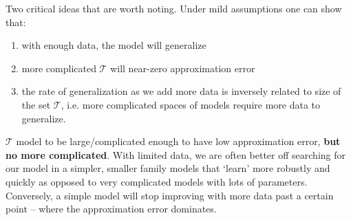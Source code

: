 Two critical ideas that are worth noting. Under mild assumptions one can show that:
\begin{enumerate}
\item with enough data, the model will generalize
\item  more complicated $\mathcal{T}$ will near-zero approximation error 
\item the rate of generalization as we add more data is inversely related to size of the set $\mathcal{T}$, i.e. more complicated spaces of models require more data to generalize. 
\end{enumerate}
$\mathcal{T}$ model to be large/complicated enough to have low approximation error,  \textbf{but no more complicated}.  With limited data, we are often better off searching for our model in a simpler, smaller family models that `learn' more robustly and quickly as opposed to very complicated models with lots of parameters. Conversely,  a simple model will stop improving with more data past a certain point -- where the approximation error dominates.